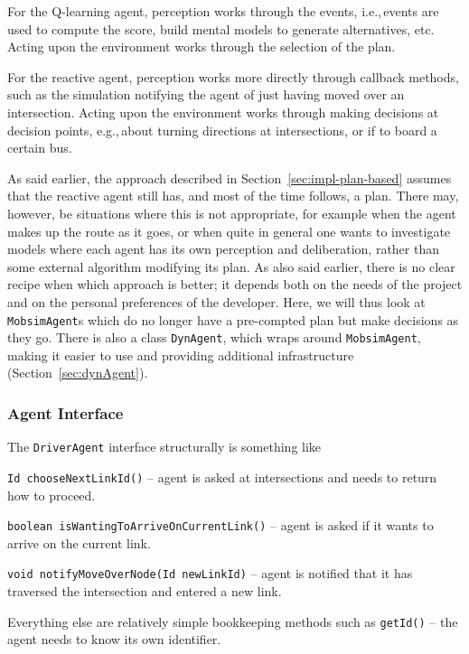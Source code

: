 For the Q-learning agent, perception works through the events, i.e.,\,events are used to compute the score, build mental models to generate alternatives, etc. Acting upon the environment works through the selection of the plan.

For the reactive agent, perception works more directly through callback methods, such as the simulation notifying the agent of just having moved over an intersection. Acting upon the environment works through making decisions at decision points, e.g.,\,about turning directions at intersections, or if to board a certain bus.

As said earlier, the approach described in Section~\ref{sec:impl-plan-based} assumes that the reactive agent still has, and most of the time follows, a plan. There may, however, be situations where this is not appropriate, for example when the agent makes up the route as it goes, or when quite in general one wants to investigate models where each agent has its own perception and deliberation, rather than some external algorithm modifying its plan. As also said earlier, there is no clear recipe when which approach is better; it depends both on the needs of the project and on the personal preferences of the developer.
%
Here, we will thus look at \lstinline$MobsimAgent$s which do no longer have a pre-compted plan but make decisions as they go. There is also a class \lstinline$DynAgent$, which wraps around \lstinline$MobsimAgent$, making it easier to use and providing additional infrastructure (Section~\ref{sec:dynAgent}).

\subsubsection{Agent Interface}
The \lstinline$DriverAgent$ interface structurally is something like
\begin{compactitem}
\item \lstinline$Id chooseNextLinkId()$ -- agent is asked at intersections and needs to return how to proceed.



\item \lstinline$boolean isWantingToArriveOnCurrentLink()$ -- agent is asked if it wants to arrive on the current link.
\item \lstinline$void notifyMoveOverNode(Id newLinkId)$ -- agent is notified that it has traversed the intersection and entered a new link.
\end{compactitem}
%
Everything else are relatively simple bookkeeping methods such as \lstinline$getId()$ -- the agent needs to know its own identifier.

